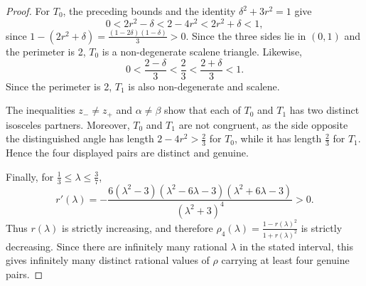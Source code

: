 \documentclass[10pt,a4paper]{amsart}
\begin{document}
\begin{proof}
For $T_0$, the preceding bounds and the identity
$\delta^2+3r^2=1$ give
\[
0<2r^2-\delta
<
2-4r^2
<
2r^2+\delta
<1,
\]
since $1-(2r^2+\delta)
=\frac{(1-2\delta)(1-\delta)}{3}>0.$ Since the three sides lie in $(0,1)$ and the perimeter is 2,  $T_0$ is a non-degenerate scalene triangle. Likewise,
\[
0<
\frac{2-\delta}{3}
<
\frac23
<
\frac{2+\delta}{3}
<1.
\]
Since the perimeter is 2,  $T_1$ is also non-degenerate and scalene.

The inequalities $z_-\ne z_+$ and $\alpha\ne \beta$ show that each of
$T_0$ and $T_1$ has two distinct isosceles partners. Moreover,
$T_0$ and $T_1$ are not congruent, as  the side opposite the distinguished
angle has length
$2-4r^2>\frac23$
for $T_0$, while it has length $\frac23$ for $T_1$. Hence the four
displayed pairs are distinct and genuine.

Finally, for $\frac13\leq\lambda\leq\frac37$,
\[
r'(\lambda)
=
-\frac{
6(\lambda^2-3)(\lambda^2-6\lambda-3)
(\lambda^2+6\lambda-3)}
{(\lambda^2+3)^4}
>0.
\]Thus $r(\lambda)$ is strictly
increasing, and therefore
$\rho_4(\lambda)=\frac{1-r(\lambda)^2}{1+r(\lambda)^2}$
is strictly decreasing. Since there are infinitely many rational
$\lambda$ in the stated interval, this gives infinitely many distinct
rational values of $\rho$ carrying at least four genuine pairs.
\end{proof}
\end{document}
